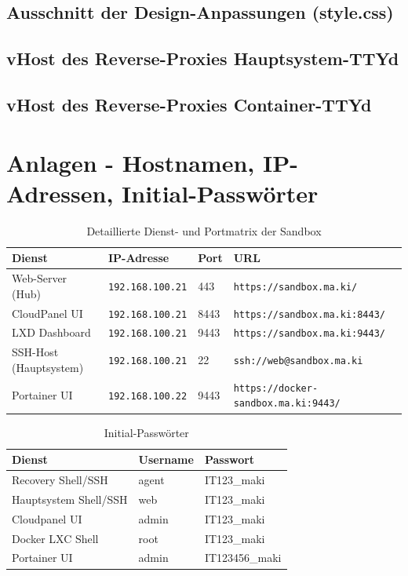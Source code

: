 \documentclass[11pt,
a4paper,
numbers=nonperiod,
footsepline,
oneside,
numbers=noenddot,
bibliography=totoc
]{scrartcl}
\begin{document}
\subsection{Ausschnitt der Design-Anpassungen (style.css)} \label{app:css_style}

\bigskip

\subsection{vHost des Reverse-Proxies Hauptsystem-TTYd} \label{vhost:web}

\bigskip

\subsection{vHost des Reverse-Proxies Container-TTYd} \label{vhost:docker}


\newpage
\section{Anlagen - Hostnamen, IP-Adressen, Initial-Passwörter} \label{sec:pass}

\begin{table}[H]
	\centering
	\caption{Detaillierte Dienst- und Portmatrix der Sandbox}
	\begin{tabular}{llll}
		\hline
		\textbf{Dienst} & \textbf{IP-Adresse} & \textbf{Port} & \textbf{URL} \\ \hline
		Web-Server (Hub)   & \texttt{192.168.100.21} & 443   & \texttt{https://sandbox.ma.ki/} \\
		CloudPanel UI      & \texttt{192.168.100.21} & 8443  & \texttt{https://sandbox.ma.ki:8443/} \\
		LXD Dashboard      & \texttt{192.168.100.21} & 9443  & \texttt{https://sandbox.ma.ki:9443/} \\
		SSH-Host (Hauptsystem)          & \texttt{192.168.100.21} & 22    & \texttt{ssh://web@sandbox.ma.ki} \\
		Portainer UI    & \texttt{192.168.100.22} & 9443   & \texttt{https://docker-sandbox.ma.ki:9443/} \\ \hline
	\end{tabular}
\end{table}

\begin{table}[H]
	\centering
	\caption{Initial-Passwörter}
	\begin{tabular}{lll}
		\hline
		\textbf{Dienst} & \textbf{Username} & \textbf{Passwort} \\ \hline
		Recovery Shell/SSH   & agent & IT123\_maki \\
		Hauptsystem Shell/SSH      & web & IT123\_maki \\
		Cloudpanel UI & admin         & IT123\_maki \\
		Docker LXC Shell         & root & IT123\_maki \\
		Portainer UI          & admin & IT123456\_maki \\ \hline
	\end{tabular}
\end{table}
\end{document}
